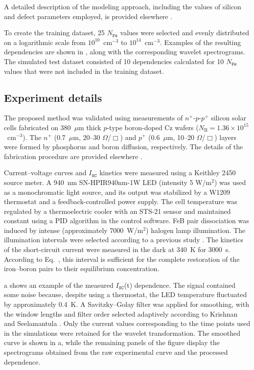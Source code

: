 \documentclass[10pt]{iopart}
\begin{document}
A detailed description of the modeling approach, including the values of silicon and defect parameters employed, is provided elsewhere \cite{Olikh2025MSEB, Olikh2019SM}.

To create the training dataset, 25 $N_\mathtt{Fe}$ values were selected and evenly distributed on a logarithmic scale from $10^{10}$~cm$^{-3}$ to $10^{14}$~cm$^{-3}$.
Examples of the resulting dependencies are shown in , along with the corresponding wavelet spectrograms.
The simulated test dataset consisted of 10 dependencies calculated for 10 $N_\mathtt{Fe}$ values that were not included in the training dataset.



\subsection{Experiment details}\label{subsec:ExpDet}

The proposed method was validated using measurements of $n^+$-$p$-$p^+$ silicon solar cells fabricated on
380~$\mu$m thick $p$-type boron-doped Cz wafers ($N_\mathrm{B}=1.36\times10^{15}$~cm$^{-3}$).
The $n^+$ (0.7~$\mu$m, 20–30 $\Omega$/$\Box$) and $p^+$ (0.6~$\mu$m, 10–20 $\Omega$/$\Box$)
layers were formed by phosphorus and boron diffusion, respectively.
The details of the fabrication procedure are provided elsewhere \cite{Olikh2021JAP}.

Current–voltage curves and $I_\mathtt{SC}$ kinetics were measured using a Keithley 2450 source meter.
A 940~nm SN-HPIR940nm-1W LED (intensity 5 W/m$^{2}$) was used as a monochromatic light source,
and its output was stabilized by a W1209 thermostat and a feedback-controlled power supply.
The cell temperature was regulated by a thermoelectric cooler with an STS-21 sensor and maintained constant using a PID algorithm in the control software.
FeB pair dissociation was induced by intense (approximately 7000~W/m$^{2}$) halogen lamp illumination.
The illumination intervals were selected according to a previous study \cite{OlikhPSSA}.
The kinetics of the short-circuit current were measured in the dark at 340~K for 3000~s.
According to Eq.~, this interval is sufficient for the complete restoration of the iron–boron pairs to their equilibrium concentration.


a shows an example of the measured $I_\mathtt{SC}$(t) dependence.
The signal contained some noise because, despite using a thermostat, the LED temperature fluctuated by approximately 0.4~K.
A Savitzky–Golay filter was applied for smoothing, with the window lengths and filter order selected adaptively according to Krishnan and Seelamantula \cite{Krishnan2013}.
Only the current values corresponding to the time points used in the simulations were retained for the wavelet transformation.
The smoothed curve is shown in a,
while the remaining panels of the figure display the spectrograms obtained from the raw experimental curve and the processed dependence.
\end{document}
